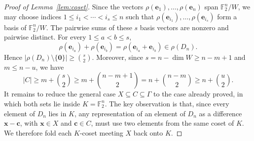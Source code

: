 \documentclass[11pt]{article}
\theoremstyle{definition}
\begin{document}
\begin{proof}[Proof of Lemma~\ref{lem:coset}]
Since the vectors
\(
    \rho(\boldsymbol{e}_1),\dots,\rho(\boldsymbol{e}_n)
\)
span \(\mathbb{F}_2^n/W\), we may choose indices
\(
    1\le i_1<\cdots<i_s\le n
\)
such that
\(  \rho(\boldsymbol{e}_{i_1}),\dots,\rho(\boldsymbol{e}_{i_s})
\)
form a basis of \(\mathbb{F}_2^n/W\).  The pairwise sums of these \(s\) basis vectors are nonzero and pairwise distinct. For every \(1\le a<b\le s\),
\[
    \rho(\boldsymbol{e}_{i_a})+\rho(\boldsymbol{e}_{i_b})
    =
    \rho(\boldsymbol{e}_{i_a}+\boldsymbol{e}_{i_b})
    \in \rho(D_n).
\]
Hence
\(
    |\rho(D_n)\setminus\{\boldsymbol{0}\}|
    \ge \binom{s}{2}.
\)
Moreover, since \(s=n-\dim W\ge n-m+1\) and \(m\le n-u\), we have
\[
    |C|\ge m+\binom{s}{2}\ge m+\binom{n-m+1}{2}= n+\binom{n-m}{2}\ge n+\binom{u}{2}.
\]
It remains to reduce the general case \(X\subseteq C\subseteq \Gamma\) to the case already proved, in which both sets lie inside \(K=\mathbb{F}_2^n\). The key observation is that, since every element of \(D_n\) lies in \(K\), any representation of an element of \(D_n\) as a difference \(\boldsymbol{x}-\boldsymbol{c}\), with \(\boldsymbol{x}\in X\) and \(\boldsymbol{c}\in C\), must use two elements from the same coset of \(K\).  We therefore fold each \(K\)-coset meeting \(X\) back onto \(K\).


\end{proof}
\end{document}
